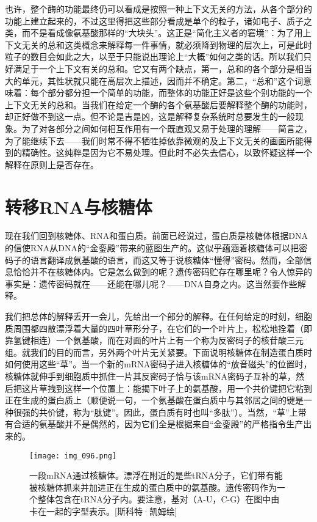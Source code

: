 也许，整个酶的功能最终仍可以看成是按照一种上下文无关的方法，从各个部分的功能上建立起来的，不过这里得把这些部分看成是单个的粒子，诸如电子、质子之类，而不是看成像氨基酸那样的“大块头”。这正是“简化主义者的窘境”：为了用上下文无关的总和这类概念来解释每一件事情，就必须降到物理的层次上，可是此时粒子的数目会如此之大，以至于只能说出理论上“大概”如何之类的话。所以我们只好满足于一个上下文有关的总和。它又有两个缺点，第一，总和的各个部分是相当大的单元，其性状就只能在高层次上描述，因而并不确定。第二，“总和”这个词意味着：每个部分都分担一个简单的功能，而整体的功能正好是这些个别功能的一个上下文无关的总和。当我们在给定一个酶的各个氨基酸后要解释整个酶的功能时，却正好做不到这一点。但不论是吉是凶，这是解释复杂系统时总要发生的一般现象。为了对各部分之间如何相互作用有一个既直观又易于处理的理解——简言之，为了能继续下去——我们时常不得不牺牲掉依靠微观的及上下文无关的画面所能得到的精确性。这纯粹是因为它不易处理。但此时不必失去信心，以致怀疑这样一个解释在原则上是否存在。

\section{转移RNA与核糖体}

现在我们回到核糖体、RNA和蛋白质。前面已经说过，蛋白质是核糖体根据DNA的信使RNA从DNA的“金銮殿”带来的蓝图生产的。这似乎蕴涵着核糖体可以把密码子的语言翻译成氨基酸的语言，而这又等于说核糖体“懂得”密码。然而，全部信息恰恰并不在核糖体内。它是怎么做到的呢？遗传密码贮存在哪里呢？令人惊异的事实是：遗传密码就在——还能在哪儿呢？——DNA自身之内。这当然要作些解释。

我们把总体的解释丢开一会儿，先给出一个部分的解释。在任何给定的时刻，细胞质周围都四散漂浮着大量的四叶草形分子，在它们的一个叶片上，松松地拴着（即靠氢键相连）一个氨基酸，而在对面的叶片上有一个称为反密码子的核苷酸三元组。就我们的目的而言，另外两个叶片无关紧要。下面说明核糖体在制造蛋白质时如何使用这些“草”。当一个新的mRNA密码子进入核糖体的“放音磁头”的位置时，核糖体就伸手到细胞质中抓住一片其反密码子恰与该mRNA密码子互补的草，然后把这片草拽到这样一个位置上：能揭下叶子上的氨基酸，用一个共价键把它粘到正在生成的蛋白质上（顺便说一句，一个氨基酸在蛋白质中与其邻居之间的键是一种很强的共价键，称为“肽键”。因此，蛋白质有时也叫“多肽”）。当然，“草”上带有合适的氨基酸并不是偶然的，因为它们全是根据来自“金銮殿”的严格指令生产出来的。

\begin{figure}
\texttt{[image: img\_096.png]}
\caption[一段mRNA通过核糖体。]
  {一段mRNA通过核糖体。漂浮在附近的是些tRNA分子，它们带有能被核糖体抓来并加进正在生成的蛋白质中的氨基酸。遗传密码作为一个整体包含在tRNA分子内。要注意，基对（A-U，C-G）在图中由卡在一起的字型表示。[斯科特·凯姆绘]}
\end{figure}

